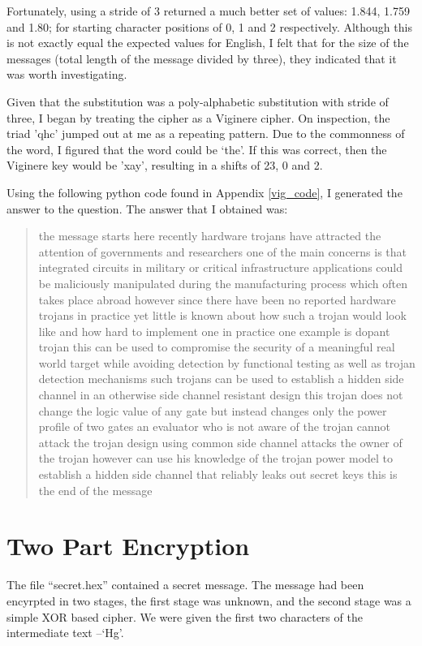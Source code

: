 \documentclass[11pt,a4paper,twoside]{article}
\begin{document}
Fortunately, using a stride of 3 returned a much better set of values: 1.844,
1.759 and 1.80; for starting character positions of 0, 1 and 2 respectively.
Although this is not exactly equal the expected values for English, I felt that
for the size of the messages (total length of the message divided by three),
they indicated that it was worth investigating.

Given that the substitution was a poly-alphabetic substitution with stride of
three, I began by treating the cipher as a Viginere cipher. On inspection, the
triad 'qhc' jumped out at me as a repeating pattern. Due to the commonness of
the word, I figured that the word could be `the'. If this was correct, then the
Viginere key would be 'xay', resulting in a shifts of 23, 0 and 2.

Using the following python code found in Appendix \ref{vig_code}, I generated
the answer to the question. The answer that I obtained was: 

\begin{quote}
\small
\raggedright
the message starts here recently hardware trojans have attracted the attention
of governments and researchers one of the main concerns is that integrated
circuits in military or critical infrastructure applications could be
maliciously manipulated during the manufacturing process which often takes
place abroad however since there have been no reported hardware trojans in
practice yet little is known about how such a trojan would look like and how
hard to implement one in practice one example is dopant trojan this can be used
to compromise the security of a meaningful real world target while avoiding
detection by functional testing as well as trojan detection mechanisms such
trojans can be used to establish a hidden side channel in an otherwise side
channel resistant design this trojan does not change the logic value of any
gate but instead changes only the power profile of two gates an evaluator who
is not aware of the trojan cannot attack the trojan design using common side
channel attacks the owner of the trojan however can use his knowledge of the
trojan power model to establish a hidden side channel that reliably leaks out
secret keys this is the end of the message
\end{quote}
 


\vfill
\pagebreak
\section{Two Part Encryption}
The file ``secret.hex'' contained a secret message. The message had been
encyrpted in two stages, the first stage was unknown, and the second stage was
a simple XOR based cipher. We were given the first two characters of the
intermediate text --`Hg'.
\end{document}
